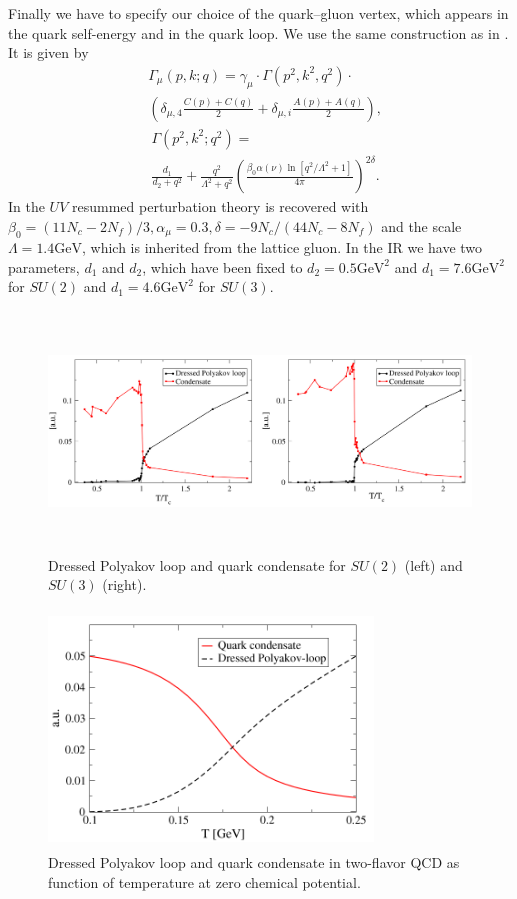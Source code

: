 \documentclass[a4paper,fleqn]{cas-dc}
\begin{document}
Finally we have to specify our choice of the quark–gluon vertex, which appears in the quark self-energy and in the quark
loop. We use the same construction as in \cite{Fischer2010}. It is given by
\begin{equation}
\begin{split}
	&\Gamma_\mu(p, k; q) = \gamma_\mu \cdot \Gamma(p^2, k^2, q^2) \cdot \\
	& \left(\delta_{\mu, 4} \frac{C(p) + C(q)}{2} + \delta_{\mu, i} \frac{A(p) + A(q)}{2}\right),
	\end{split}
	\end{equation}\begin{equation}
	\begin{split}
	&\Gamma(p^2, k^2; q^2) = \\ 
	&\frac{d_1}{d_2 + q^2} + \frac{q^2}{\Lambda^2 + q^2}\left(\frac{\beta_0 \alpha(\nu) \ln [q^2 / \Lambda^2 + 1]}{4 \pi}\right)^{2 \delta}.
	\end{split}
\end{equation}
	In the $UV$ resummed perturbation theory is recovered with $\beta_0 = ( 11N_c - 2N_f )/ 3 , \alpha_\mu = 0.3 , \delta = - 9N_c /( 44N_c - 8N_f )$ and
	the scale $\Lambda = 1.4\text{GeV}$, which is inherited from the lattice gluon. In the IR we have two parameters, $d_1$ and $d_2$, which have
	been fixed to $d_2 = 0.5 \text{GeV}^2$ and $d_1 = 7.6 \text{GeV}^2$ for $SU(2)$ and $d_1 = 4.6 \text{GeV}^2$ for $SU(3)$.
	\begin{figure}
		\centering
		\includegraphics[width=\textwidth,height=2.5in]{fig3.png}
		\caption{Dressed Polyakov loop and quark condensate for $SU ( 2 )$ (left) and $SU ( 3 )$ (right).}
		\label{FIG:3}
	\end{figure}
	\begin{figure}
		\centering
		\includegraphics[width=3.4in,height=2.5in]{fig4.png}
		\caption{Dressed Polyakov loop and quark condensate in two-flavor QCD as function of temperature at zero chemical potential.}
		\label{FIG:4}
	\end{figure}
\end{document}
